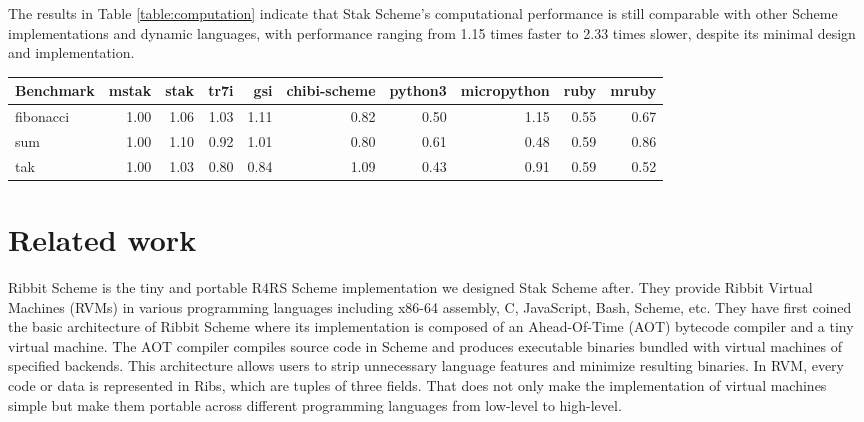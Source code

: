 \documentclass[sigplan, anonymous, review]{acmart}
\begin{document}
The results in Table \ref{table:computation} indicate that Stak
Scheme's computational performance is still comparable with other
Scheme implementations and dynamic languages, with performance
ranging from 1.15 times faster to 2.33 times slower,
despite its minimal design and implementation.

\begin{table*}
  \begin{center}
    \caption{Computational benchmarks (relative time. lower is better.)}
    \label{table:computation}
    \begin{tabular}{l|rrrrrrrrr}
      \hline
      Benchmark & mstak & stak & tr7i & gsi & chibi-scheme & python3
      & micropython & ruby & mruby \\
      \hline
      fibonacci & 1.00 & 1.06 & 1.03 & 1.11 & 0.82 & 0.50 & 1.15 &
      0.55 & 0.67 \\
      sum & 1.00 & 1.10 & 0.92 & 1.01 & 0.80 & 0.61 & 0.48 & 0.59 & 0.86 \\
      tak & 1.00 & 1.03 & 0.80 & 0.84 & 1.09 & 0.43 & 0.91 & 0.59 & 0.52 \\
      \hline
    \end{tabular}
  \end{center}
\end{table*}

\section{Related work}

Ribbit Scheme \cite{ribbit2023} is the tiny and portable R4RS Scheme
implementation we designed Stak Scheme after. They provide
Ribbit Virtual Machines (RVMs) in various programming languages
including x86-64 assembly, C, JavaScript, Bash, Scheme, etc.
They have first coined the basic architecture of Ribbit Scheme
\cite{ribbit2021} where its implementation is composed of an
Ahead-Of-Time (AOT) bytecode compiler and a tiny virtual machine.
The AOT compiler compiles source code in Scheme and produces
executable binaries bundled with virtual machines of specified backends.
This architecture allows users to strip unnecessary language
features and minimize resulting binaries.
In RVM, every code or data is represented in
Ribs, which are tuples of three fields.
That does not only make the implementation of
virtual machines simple but make them portable across different
programming languages from low-level to high-level.
\end{document}
